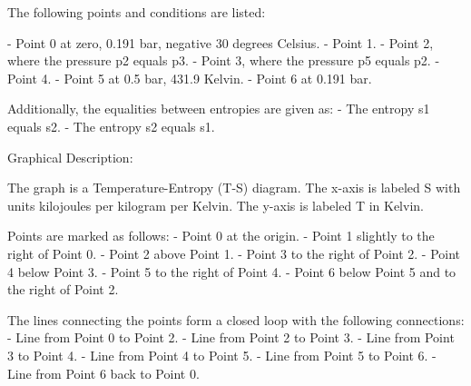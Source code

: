 The following points and conditions are listed:

- Point 0 at zero, 0.191 bar, negative 30 degrees Celsius.
- Point 1.
- Point 2, where the pressure p2 equals p3.
- Point 3, where the pressure p5 equals p2.
- Point 4.
- Point 5 at 0.5 bar, 431.9 Kelvin.
- Point 6 at 0.191 bar.

Additionally, the equalities between entropies are given as:
- The entropy s1 equals s2.
- The entropy s2 equals s1.

Graphical Description:

The graph is a Temperature-Entropy (T-S) diagram. The x-axis is labeled S with units kilojoules per kilogram per Kelvin. The y-axis is labeled T in Kelvin.

Points are marked as follows:
- Point 0 at the origin.
- Point 1 slightly to the right of Point 0.
- Point 2 above Point 1.
- Point 3 to the right of Point 2.
- Point 4 below Point 3.
- Point 5 to the right of Point 4.
- Point 6 below Point 5 and to the right of Point 2.

The lines connecting the points form a closed loop with the following connections:
- Line from Point 0 to Point 2.
- Line from Point 2 to Point 3.
- Line from Point 3 to Point 4.
- Line from Point 4 to Point 5.
- Line from Point 5 to Point 6.
- Line from Point 6 back to Point 0.